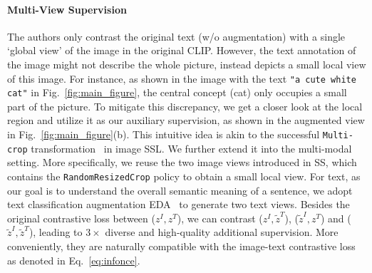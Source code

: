 \paragraph{Multi-View Supervision}
\label{sec:mvs}
The authors only contrast the original text (w/o augmentation) with a single `global view' of the image in the original CLIP. 
However, the text annotation of the image might not describe the whole picture, instead depicts a small local view of this image. 
For instance, as shown in the image with the text \texttt{"a cute white cat"} in Fig.~\ref{fig:main_figure}, the central concept (cat) only occupies a small part of the picture.
To mitigate this discrepancy, we get a closer look at the local region and utilize it as our auxiliary supervision, as shown in the augmented view in Fig.~\ref{fig:main_figure}(b). This intuitive idea is akin to the successful \texttt{Multi-crop} transformation~\citep{caron2020unsupervised, van2021revisiting} in image SSL. 
We further extend it into the multi-modal setting. 
More specifically, we reuse the two image views introduced in SS, which contains the \texttt{RandomResizedCrop} policy to obtain a small local view.
For text, as our goal is to understand the overall semantic meaning of a sentence, we adopt text classification augmentation EDA~\citep{wei2019eda} to generate two text views. 
Besides the original contrastive loss between (${z}^I, {z}^T$), we can contrast (${z}^I, \tilde{z}^T$), ($\tilde{z}^I, {z}^T$) and ($\tilde{z}^I, \tilde{z}^T$), leading to $3\times$ diverse and high-quality additional supervision.
More conveniently, they are naturally compatible with the image-text contrastive loss as denoted in Eq.~\ref{eq:infonce}.

